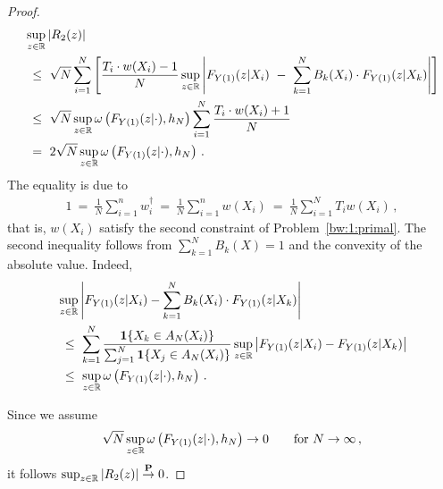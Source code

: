 \begin{proof}
\begin{align*}
&
  \sup_{z\in\R}
  \left| 
  R_2(z)
  \right|
  \\
  &
  \ 
  \le
  \ 
  \sqrt{N}
    \sum_{i=1}^{N} 
    \left[ 
  \frac{
    T_i\cdot w(X_i) -1 }{N}
  \sup_{z\in\R}
    \left| 
  F_{Y(1)}(z|X_i)
    \ 
    -
    \ 
    \sum_{k=1}^{N} 
    B_k(X_i)
    \cdot
  F_{Y(1)}(z|X_k)
    \right|
    \right]
    \\
    &
  \ 
    \le
  \ 
    \sqrt{N}
  \sup_{z\in\R}
  \omega
  \left( 
    F_{Y(1)}(z|\cdot)
    ,h_N
  \right)
  \sum_{i=1}^{N} 
  \frac{
    T_i\cdot w(X_i) +1 }{N}
    \\
    &
  \ 
    =
  \ 
    2
    \sqrt{N}
  \sup_{z\in\R}
  \omega
  \left( 
    F_{Y(1)}(z|\cdot)
    ,h_N
  \right)
  \,.
\end{align*}
The equality is due to 
\begin{gather}
  1
  \ 
  =
  \ 
\frac{1}{N}\sum_{i=1}^{n}w_i^\dagger
  \ 
  =
  \ 
\frac{1}{N}\sum_{i=1}^{n}w(X_i)
  \ 
=
  \ 
\frac{1}{N}\sum_{i=1}^{N}T_iw(X_i)
\,,
\end{gather}
that is, $w(X_i)$ satisfy the second constraint of Problem~\ref{bw:1:primal}.
The second inequality follows from 
$\sum_{k=1}^{N}B_k(X)=1$ and the convexity of the absolute value. 
Indeed,
\begin{align*}
&
  \sup_{z\in\R}
  \left| 
  F_{Y(1)}(z|X_i)
  -
  \sum_{k=1}^{N} 
  B_k(X_i)
  \cdot
  F_{Y(1)}(z|X_k)
  \right|
  \\
  &
  \ 
  \le
  \ 
  \sum_{k=1}^{N} 
  \frac{\mathbf{1}{\left\{ X_k\in A_N(X_i) \right\}}}
  {
    \sum_{j=1}^{N} 
\mathbf{1}{\left\{ X_j\in A_N(X_i) \right\}}
  }
  \sup_{z\in\R}
  \left| 
  F_{Y(1)}(z|X_i)
  -
  F_{Y(1)}(z|X_k)
  \right|
  \\
  &
  \ 
  \le
  \ 
  \sup_{z\in\R}
  \omega
  \left( 
    F_{Y(1)}(z|\cdot)
    ,h_N
  \right)
  \,.
\end{align*}

Since we assume
\begin{gather*}
  \sqrt{N}
  \sup_{z\in\R}
  \omega
  \left( 
    F_{Y(1)}(z|\cdot)
    ,h_N
  \right)
  \to
  0
  \qquad
  \text{for}\ 
  N\to \infty
  \,,
\end{gather*}
it follows
$\sup_{z\in\mathbb{R}}|R_2(z)|\overset{\mathbf{P}}{\to}0$.
\end{proof}
